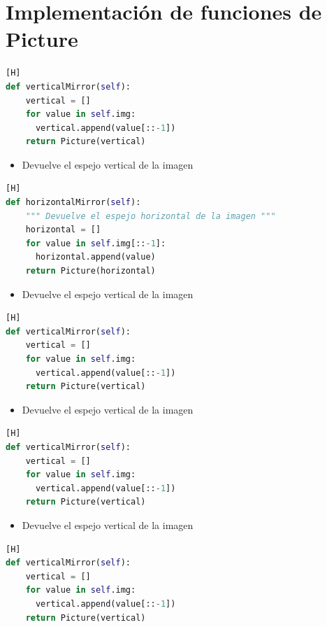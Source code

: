 \documentclass{article}
\begin{document}
\section{Implementación de funciones de Picture}
	\begin{lstlisting}[language=Python,caption={Función verticalMirror(self)}][H]
def verticalMirror(self):
    vertical = []
    for value in self.img:
      vertical.append(value[::-1])
    return Picture(vertical)
	\end{lstlisting}
	\begin{itemize}
		\item Devuelve el espejo vertical de la imagen 
	\end{itemize}
	\begin{lstlisting}[language=Python,caption={Función horizontalMirror(self)}][H]
def horizontalMirror(self):
    """ Devuelve el espejo horizontal de la imagen """
    horizontal = []
    for value in self.img[::-1]:
      horizontal.append(value)
    return Picture(horizontal)

	\end{lstlisting}
	\begin{itemize}
		\item Devuelve el espejo vertical de la imagen 
	\end{itemize}
	\begin{lstlisting}[language=Python,caption={Función VerticalMirror()}][H]
def verticalMirror(self):
    vertical = []
    for value in self.img:
      vertical.append(value[::-1])
    return Picture(vertical)
	\end{lstlisting}
	\begin{itemize}
		\item Devuelve el espejo vertical de la imagen 
	\end{itemize}
	\begin{lstlisting}[language=Python,caption={Función VerticalMirror()}][H]
def verticalMirror(self):
    vertical = []
    for value in self.img:
      vertical.append(value[::-1])
    return Picture(vertical)
	\end{lstlisting}
	\begin{itemize}
		\item Devuelve el espejo vertical de la imagen 
	\end{itemize}
	\begin{lstlisting}[language=Python,caption={Función VerticalMirror()}][H]
def verticalMirror(self):
    vertical = []
    for value in self.img:
      vertical.append(value[::-1])
    return Picture(vertical)
	\end{lstlisting}
\end{document}
